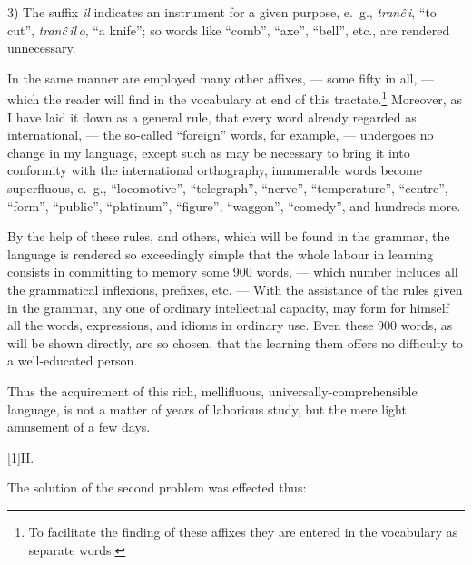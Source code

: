 \documentclass[12pt,twoside]{book}
\begin{document}
3) The suffix \emph{il} indicates an instrument for a given purpose, e.~g., \emph{tranĉ\,i}, “to cut”, \emph{tranĉ\,il\,o}, “a knife”; so words like “comb”, “axe”, “bell”, etc., are rendered unnecessary.

In the same manner are employed many other affixes, --- some fifty in all, --- which the reader will find in the vocabulary at end of this tractate.\footnote{To facilitate the finding of these affixes they are entered in the vocabulary as separate words.} Moreover, as I have laid it down as a general rule, that every word already regarded as international, --- the so-called “foreign” words, for example, --- undergoes no change in my language, except such as may be necessary to bring it into conformity with the international orthography, innumerable words become superfluous, e.~g., “locomotive”, “telegraph”, “nerve”, “temperature”, “centre”, “form”, “public”, “platinum”, “figure”, “waggon”, “comedy”, and hundreds more.

By the help of these rules, and others, which will be found in the grammar, the language is rendered so exceedingly simple that the whole labour in learning consists in committing to memory some 900 words, --- which number includes all the grammatical inflexions, prefixes, etc. --- With the assistance of the rules given in the grammar, any one of ordinary intellectual capacity, may form for himself all the words, expressions, and idioms in ordinary use. Even these 900 words, as will be shown directly, are so chosen, that the learning them offers no difficulty to a well-educated person.

Thus the acquirement of this rich, mellifluous, universally-comprehensible language, is not a matter of years of laborious study, but the mere light amusement of a few days. 

\vspace{12pt}

{\hfil \scalebox{2}[1]{\large\cowboyfont II.}}
{}

\vspace{12pt}

The solution of the second problem was effected thus:
\end{document}
